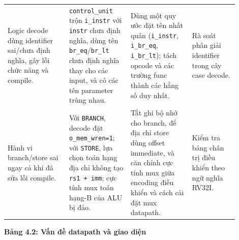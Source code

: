 \documentclass[10pt,a4paper]{article}
\begin{document}
\begin{center}
\begin{tabular}{@{}p{0.24\linewidth}p{0.24\linewidth}p{0.24\linewidth}p{0.18\linewidth}@{}}
\addlinespace
Logic decode dùng identifier sai/chưa định nghĩa, gây lỗi chức năng và compile. &
\texttt{control\_unit} trộn \texttt{i\_instr} với \texttt{instr} chưa định nghĩa, dùng tên \texttt{br\_eq}/\texttt{br\_lt} chưa định nghĩa thay cho các input, và có các tên parameter trùng nhau. &
Dùng một quy ước đặt tên nhất quán (\texttt{i\_instr}, \texttt{i\_br\_eq}, \texttt{i\_br\_lt}); tách opcode và các trường func thành các hằng số duy nhất. &
Rà soát phân giải identifier trong cây case decode. \\
\addlinespace
Hành vi branch/store sai ngay cả khi đã sửa lỗi compile. &
Với \texttt{BRANCH}, decode đặt \texttt{o\_mem\_wren=1}; với \texttt{STORE}, lựa chọn toán hạng địa chỉ không tạo \texttt{rs1 + imm}; cực tính mux toán hạng-B của ALU bị đảo. &
Tắt ghi bộ nhớ cho branch, để địa chỉ store dùng offset immediate, và căn chỉnh cực tính mux giữa encoding điều khiển và cách cài đặt mux datapath. &
Kiểm tra bảng chân trị điều khiển theo ngữ nghĩa RV32I. \\
\bottomrule
\end{tabular}
\end{center}

\textbf{Bảng 4.2: Vấn đề datapath và giao diện}
\end{document}
